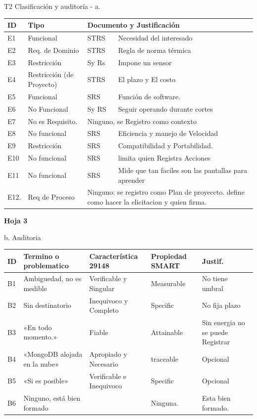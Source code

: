 \documentclass[12pt,a4paper]{article}
\begin{document}
T2 Clasificación y auditoría - a.

\begin{center}
\begin{tabular}{|l|p{3.4cm}|l|p{5.2cm}|}
\hline
ID & Tipo & \multicolumn{2}{l|}{Documento y Justificación} \\
\hline
E1 & Funcional & STRS & Necesidad del interesado \\
\hline
E2 & Req. de Dominio & STRS & Regla de norma térmica \\
\hline
E3 & Restricción & Sy Rs & Impone un sensor \\
\hline
E4 & Restricción (de Proyecto) & STRS & El plazo y El costo \\
\hline
E5 & Funcional & SRS & Función de software. \\
\hline
E6 & No Funcional & Sy RS & Seguir operando durante cortes \\
\hline
E7 & No es Requisito. & \multicolumn{2}{l|}{Ninguno, se Registro como contexto} \\
\hline
E8 & No funcional & SRS & Eficiencia y manejo de Velocidad \\
\hline
E9 & Restricción & SRS & Compatibilidad y Portabilidad. \\
\hline
E10 & No funcional & SRS & limita quien Registra Acciones \\
\hline
E11 & No funcional & SRS & Mide que tan faciles son las pantallas para aprender \\
\hline
E12. & Req de Proceso & \multicolumn{2}{p{7.2cm}|}{Ninguno: se registro como Plan de proyeccto. define como hacer la elicitacion y quien firma.} \\
\hline
\end{tabular}
\end{center}

\newpage
\textbf{Hoja 3}

b. Auditoria

\begin{center}
\small
\begin{tabular}{|l|p{2.6cm}|p{2.6cm}|p{2.2cm}|p{2.6cm}|}
\hline
ID & Termino o problematico & Característica 29148 & Propiedad SMART & Justif. \\
\hline
B1 & Ambiguedad, no es medible & Verificable y Singular & Measurable & No tiene umbral \\
\hline
B2 & Sin destinatorio & Inequivoco y Completo & Specific & No fija plazo \\
\hline
B3 & «En todo momento.» & Fiable & Attainable & Sin energia no se puede Registrar \\
\hline
B4 & «MongoDB alojada en la nube» & Apropiado y Necesario & traceable & Opcional \\
\hline
B5 & «Si es posible» & Verificable e Inequivoco & Specific & Opcional \\
\hline
B6 & Ninguno, está bien formado &  & Ninguna. & Esta bien formado. \\
\hline
\end{tabular}
\end{center}
\end{document}
